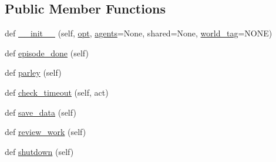 \subsection*{Public Member Functions}
\begin{DoxyCompactItemize}
\item 
def \hyperlink{classstack__rank__evals_1_1worlds_1_1MTurkPersonalityCaptionsStackRankWorld_ac193f25378717137c8681550c972be8a}{\+\_\+\+\_\+init\+\_\+\+\_\+} (self, \hyperlink{classparlai_1_1core_1_1worlds_1_1World_a3640d92718acd3e6942a28c1ab3678bd}{opt}, \hyperlink{classstack__rank__evals_1_1worlds_1_1MTurkPersonalityCaptionsStackRankWorld_a7f77bf2a4335b5ecf7ba13e0cbe22e25}{agents}=None, shared=None, \hyperlink{classstack__rank__evals_1_1worlds_1_1MTurkPersonalityCaptionsStackRankWorld_a4e5521465cddfe352b897ca6b7d36ae5}{world\+\_\+tag}=\textquotesingle{}N\+O\+NE\textquotesingle{})
\item 
def \hyperlink{classstack__rank__evals_1_1worlds_1_1MTurkPersonalityCaptionsStackRankWorld_ac1e7487bde15df0e0dafd706495a9d10}{episode\+\_\+done} (self)
\item 
def \hyperlink{classstack__rank__evals_1_1worlds_1_1MTurkPersonalityCaptionsStackRankWorld_a41817ec1f909df958b73f3b5d810299e}{parley} (self)
\item 
def \hyperlink{classstack__rank__evals_1_1worlds_1_1MTurkPersonalityCaptionsStackRankWorld_a60ac9e09fd5c55d81fafc0a86794716b}{check\+\_\+timeout} (self, act)
\item 
def \hyperlink{classstack__rank__evals_1_1worlds_1_1MTurkPersonalityCaptionsStackRankWorld_a2ee07e4a6c5485756dcec60afe91a430}{save\+\_\+data} (self)
\item 
def \hyperlink{classstack__rank__evals_1_1worlds_1_1MTurkPersonalityCaptionsStackRankWorld_a2dd08f9107fee17e2833a529681d76db}{review\+\_\+work} (self)
\item 
def \hyperlink{classstack__rank__evals_1_1worlds_1_1MTurkPersonalityCaptionsStackRankWorld_a17e8b57fa31006dcb12852a791a676f9}{shutdown} (self)
\end{DoxyCompactItemize}
